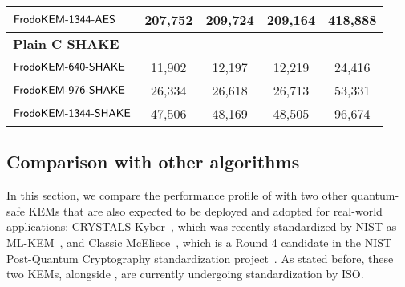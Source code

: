 \begin{table}[t]
\begin{tabular}{l|c c c|c}
$\textsf{\upshape\mdseries FrodoKEM-1344-AES}$                             &            207,752                &           209,724                   &                209,164       &               418,888             \\
\midrule
\multicolumn{5}{l}{\bf Plain C SHAKE} \\
\midrule
$\textsf{\upshape\mdseries FrodoKEM-640-SHAKE}$                               &            11,902                &           12,197                   &               12,219       &               24,416             \\
$\textsf{\upshape\mdseries FrodoKEM-976-SHAKE}$                             &            26,334                &           26,618                   &               26,713       &               53,331             \\
$\textsf{\upshape\mdseries FrodoKEM-1344-SHAKE}$                             &            47,506                &            48,169                   &                48,505       &                96,674             \\
\bottomrule
\end{tabular}
\end{table}


\subsection{Comparison with other algorithms}\label{sec:comparison}

In this section, we compare the performance profile of \FrodoKEM with two other quantum-safe KEMs
that are also expected to be deployed and adopted for real-world applications:
CRYSTALS-Kyber~\cite{EuroSP:Kyber}, which was recently standardized by NIST as ML-KEM~\cite{MLKEM}, and
Classic McEliece~\cite{CME}, which is a Round 4 candidate in the NIST Post-Quantum Cryptography standardization project~\cite{NIST17}. 
As stated before, these two KEMs, alongside \FrodoKEM, are currently undergoing standardization by ISO.



